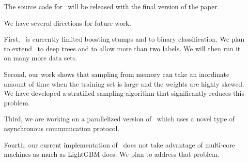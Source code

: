 The source code for \Sparrow\ will be released with the
final version of the paper.

We have several directions for future work.

First, \Sparrow\ is currently limited boosting stumps and to binary
classification. We plan to extend \Sparrow\ to deep trees and to allow
more than two labels. We will then run it on many more data sets.

Second, our work shows that sampling from memory can take an
inordinate amount of time when the training set is large and the
weights are highly skewed. We have developed a stratified sampling
algorithm that significantly reduces this problem.

Third, we are working on a parallelized version of \Sparrow\ which
uses a  novel type of asynchronous communication protocol.

Fourth, our current implementation of \Sparrow\ does not take
advantage of multi-core machines as much as LightGBM does. We plan to
address that problem.




